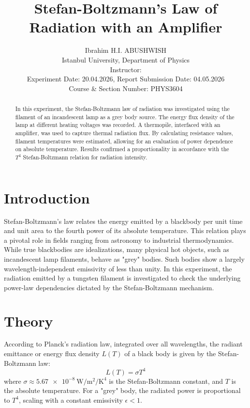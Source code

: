\documentclass[journal]{IEEEtran}
\begin{document}
\title{Stefan-Boltzmann's Law of Radiation with an Amplifier}
\author{Ibrahim H.I. ABUSHWISH \\
Istanbul University, Department of Physics \\
Instructor: \\
Experiment Date: 20.04.2026, Report Submission Date: 04.05.2026\\
Course \& Section Number: PHYS3604}


\maketitle

\begin{abstract}
    In this experiment, the Stefan-Boltzmann law of radiation was investigated using the filament of an incandescent lamp as a grey body source. The energy flux density of the lamp at different heating voltages was recorded. A thermopile, interfaced with an amplifier, was used to capture thermal radiation flux. By calculating resistance values, filament temperatures were estimated, allowing for an evaluation of power dependence on absolute temperature. Results confirmed a proportionality in accordance with the $T^4$ Stefan-Boltzmann relation for radiation intensity.
\end{abstract}

\section{Introduction}
Stefan-Boltzmann's law relates the energy emitted by a blackbody per unit time and unit area to the fourth power of its absolute temperature. This relation plays a pivotal role in fields ranging from astronomy to industrial thermodynamics. While true blackbodies are idealizations, many physical hot objects, such as incandescent lamp filaments, behave as "grey" bodies. Such bodies show a largely wavelength-independent emissivity of less than unity. In this experiment, the radiation emitted by a tungsten filament is investigated to check the underlying power-law dependencies dictated by the Stefan-Boltzmann mechanism. 

\section{Theory}
According to Planck's radiation law, integrated over all wavelengths, the radiant emittance or energy flux density $L(T)$ of a black body is given by the Stefan-Boltzmann law:
\begin{equation}
    L(T) = \sigma T^4 \label{eq:sb_law}
\end{equation}
where $\sigma \approx \SI{5.67e-8}{\W\per\square\m\per\K\tothe{4}}$ is the Stefan-Boltzmann constant, and $T$ is the absolute temperature. For a "grey" body, the radiated power is proportional to $T^4$, scaling with a constant emissivity $\epsilon < 1$.
\end{document}
